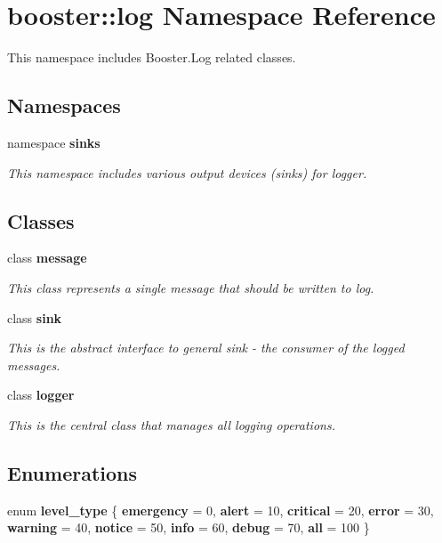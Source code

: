 \section{booster\-:\-:log \-Namespace \-Reference}
\label{namespacebooster_1_1log}


\-This namespace includes \-Booster.\-Log related classes.  


\subsection*{\-Namespaces}
\begin{DoxyCompactItemize}
\item 
namespace {\bf sinks}
\begin{DoxyCompactList}\small\item\em \-This namespace includes various output devices (sinks) for logger. \end{DoxyCompactList}\end{DoxyCompactItemize}
\subsection*{\-Classes}
\begin{DoxyCompactItemize}
\item 
class {\bf message}
\begin{DoxyCompactList}\small\item\em \-This class represents a single message that should be written to log. \end{DoxyCompactList}\item 
class {\bf sink}
\begin{DoxyCompactList}\small\item\em \-This is the abstract interface to general sink -\/ the consumer of the logged messages. \end{DoxyCompactList}\item 
class {\bf logger}
\begin{DoxyCompactList}\small\item\em \-This is the central class that manages all logging operations. \end{DoxyCompactList}\end{DoxyCompactItemize}
\subsection*{\-Enumerations}
\begin{DoxyCompactItemize}
\item 
enum {\bf level\-\_\-type} \{ \*
{\bfseries emergency} =  0, 
{\bfseries alert} =  10, 
{\bfseries critical} =  20, 
{\bfseries error} =  30, 
\*
{\bfseries warning} =  40, 
{\bfseries notice} =  50, 
{\bfseries info} =  60, 
{\bfseries debug} =  70, 
\*
{\bfseries all} =  100
 \}
\end{DoxyCompactItemize}


